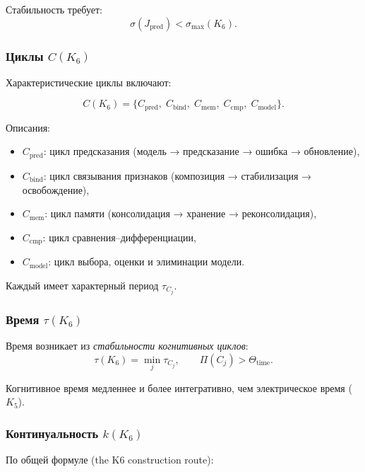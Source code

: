 Стабильность требует:
\[
\sigma(J_{\mathrm{pred}}) < \sigma_{\max}(K_6).
\]

\subsubsection{Циклы \texorpdfstring{$C(K_6)$}{C(K_6)}}

Характеристические циклы включают:

\[
C(K_6) =
\{
C_{\mathrm{pred}},\;
C_{\mathrm{bind}},\;
C_{\mathrm{mem}},\;
C_{\mathrm{cmp}},\;
C_{\mathrm{model}}
\}.
\]

Описания:
\begin{itemize}
    \item $C_{\mathrm{pred}}$: цикл предсказания (модель → предсказание →
          ошибка → обновление),
    \item $C_{\mathrm{bind}}$: цикл связывания признаков (композиция →
          стабилизация → освобождение),
    \item $C_{\mathrm{mem}}$: цикл памяти (консолидация → хранение →
          реконсолидация),
    \item $C_{\mathrm{cmp}}$: цикл сравнения–дифференциации,
    \item $C_{\mathrm{model}}$: цикл выбора, оценки и элиминации модели.
\end{itemize}

Каждый имеет характерный период $\tau_{C_j}$.

\subsubsection{Время \texorpdfstring{$\tau(K_6)$}{\tau(K_6)}}

Время возникает из \emph{стабильности когнитивных циклов}:
\[
\tau(K_6)
= \min_j \tau_{C_j},
\qquad
\Pi(C_j) > \Theta_{\mathrm{time}}.
\]

Когнитивное время медленнее и более интегративно, чем электрическое
время ($K_5$).

\subsubsection{Континуальность \texorpdfstring{$k(K_6)$}{k(K_6)}}

По общей формуле (the K6 construction route):

